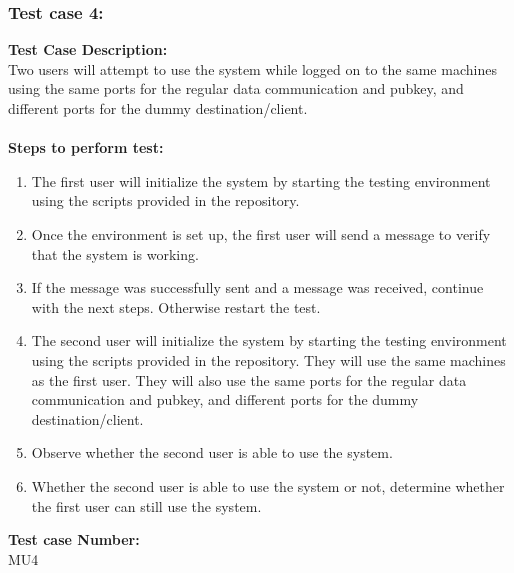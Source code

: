 \documentclass{article}
\begin{document}
\subsubsection{Test case 4: }
\textbf{Test Case Description:\\} Two users will attempt to use the system while logged on to the same machines using the same ports for the regular data communication and pubkey, and different ports for the dummy destination/client.\\\\
\textbf{Steps to perform test: } 
\begin{enumerate}
    \item The first user will initialize the system by starting the testing environment using the scripts provided in the repository.
    \item Once the environment is set up, the first user will send a message to verify that the system is working.
    \item If the message was successfully sent and a message was received, continue with the next steps. Otherwise restart the test.
    \item The second user will initialize the system by starting the testing environment using the scripts provided in the repository. They will use the same machines as the first user. They will also use the same ports for the regular data communication and pubkey, and different ports for the dummy destination/client.
    \item Observe whether the second user is able to use the system.
    \item Whether the second user is able to use the system or not, determine whether the first user can still use the system.
\end{enumerate}
\textbf{Test case Number: \\} MU4
\end{document}

